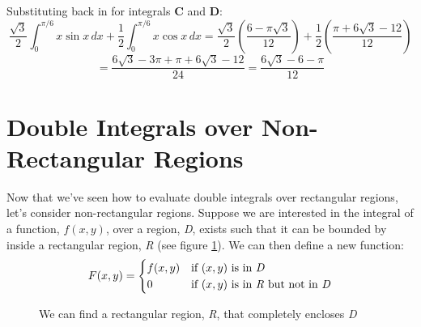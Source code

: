 \begin{Answer}[ref = fubini_2]
\begin{enumerate}
Substituting back in for integrals \textbf{C} and \textbf{D}:
$$\frac{\sqrt{3}}{2} \int_0^{\pi/6} x \sin{x}\,dx + \frac{1}{2} \int_0^{\pi/6} 
x \cos{x}\,dx = \frac{\sqrt{3}}{2} \left( \frac{6 - \pi \sqrt{3}}{12} \right) 
+ \frac{1}{2} \left( \frac{\pi + 6\sqrt{3}- 12}{12} \right)$$
$$= \frac{6 \sqrt{3} - 3\pi + \pi + 6\sqrt{3} - 12}{24} = \frac{6 \sqrt{3} - 6 
- \pi}{12}$$
\end{enumerate}
\end{Answer}

\section{Double Integrals over Non-Rectangular Regions}

Now that we've seen how to evaluate double integrals over rectangular regions, 
let's consider non-rectangular regions. Suppose we are interested in the 
integral of a function, $f(x,y)$, over a region, \textit{D}, exists such that 
it can be bounded by inside a rectangular region, \textit{R} (see figure 
\ref{fig:enclose}). We can then define a new function:
$$F(x, y) = 
\begin{cases}
	f(x, y) & \text{if } (x, y) \text{ is in \textit{D}}\\
	0 & \text{if } (x, y) \text{ is in \textit{R} but not in \textit{D}}
\end{cases}$$

\begin{figure}[htbp]
    \centering
    \begin{minipage}{0.45\textwidth}
    \end{minipage}
    \begin{minipage}{0.45\textwidth}
    \end{minipage}
    \caption{We can find a rectangular region, \textit{R}, that completely 
    encloses \textit{D}}
    \label{fig:enclose}
\end{figure}

